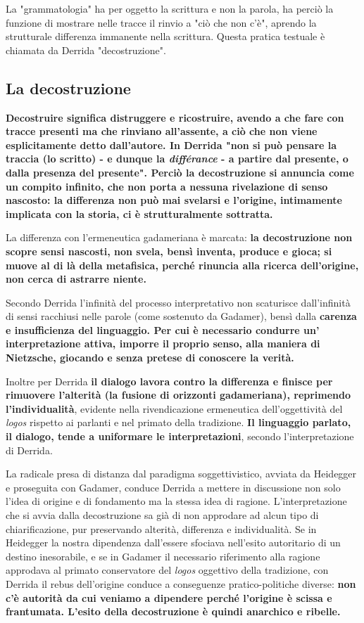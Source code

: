 La "grammatologia" ha per oggetto la scrittura e
non la parola, ha perciò la funzione di
mostrare nelle tracce il rinvio a "ciò che non
c'è", aprendo la strutturale differenza immanente
nella scrittura. Questa pratica testuale è
chiamata da Derrida "decostruzione".

\subsection{La decostruzione}

\textbf{Decostruire significa distruggere e ricostruire,
avendo a che fare con tracce presenti ma che rinviano
all'assente, a ciò che non viene esplicitamente
detto dall'autore.
In Derrida "non si può pensare la traccia (lo scritto) - e dunque la \textit{différance} - a partire dal presente, o dalla presenza del presente". Perciò la decostruzione
si annuncia come un compito infinito, che non porta
a nessuna rivelazione di senso nascosto: la differenza
non può mai svelarsi e l'origine, intimamente
implicata con la storia, ci è strutturalmente sottratta.}

La differenza con l'ermeneutica gadameriana è
marcata: \textbf{la decostruzione non scopre sensi nascosti,
non svela, bensì inventa, produce e gioca; si muove al di là della metafisica, perché
rinuncia alla ricerca dell'origine, non cerca di astrarre niente.}

Secondo Derrida l'infinità del processo interpretativo non scaturisce dall'infinità di sensi racchiusi
nelle parole (come sostenuto da Gadamer), bensì dalla \textbf{carenza e
insufficienza del linguaggio. Per cui è necessario 
condurre un' interpretazione attiva, imporre il
proprio senso, alla maniera di Nietzsche,
giocando e senza pretese di conoscere la verità.}

Inoltre per Derrida\textbf{ il dialogo lavora contro la
differenza e finisce per rimuovere l'alterità
(la fusione di orizzonti gadameriana), reprimendo
l'individualità}, evidente nella rivendicazione
ermeneutica dell'oggettività del \textit{logos}
rispetto ai parlanti e nel primato della tradizione. \textbf{Il linguaggio parlato, il dialogo, tende a uniformare le interpretazioni}, secondo l'interpretazione di Derrida.

La radicale presa di distanza dal paradigma
soggettivistico, avviata da Heidegger e proseguita
con Gadamer, conduce Derrida a mettere in
discussione non solo l'idea di origine e di fondamento ma la stessa idea di ragione.
L'interpretazione che si avvia dalla decostruzione sa già di non approdare ad alcun
tipo di chiarificazione, pur preservando alterità,
differenza e individualità.
Se in Heidegger la nostra dipendenza dall'essere
sfociava nell'esito autoritario di un destino
inesorabile, e se in Gadamer il necessario riferimento
alla ragione approdava al primato conservatore
del \textit{logos} oggettivo della tradizione, con Derrida
il rebus dell'origine conduce a conseguenze
pratico-politiche diverse: \textbf{non c'è autorità
da cui veniamo a dipendere perché l'origine
è scissa e frantumata. L'esito della decostruzione è quindi anarchico e ribelle.}

